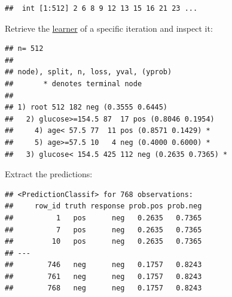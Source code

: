 \documentclass[]{scrbook}
\newenvironment{Shaded}{\begin{snugshade}}{\end{snugshade}}
\newcommand{\CommentTok}[1]{\textcolor[rgb]{0.56,0.35,0.01}{\textit{#1}}}
\newcommand{\DecValTok}[1]{\textcolor[rgb]{0.00,0.00,0.81}{#1}}
\newcommand{\KeywordTok}[1]{\textcolor[rgb]{0.13,0.29,0.53}{\textbf{#1}}}
\newcommand{\NormalTok}[1]{#1}
\newcommand{\OperatorTok}[1]{\textcolor[rgb]{0.81,0.36,0.00}{\textbf{#1}}}
\newcommand{\StringTok}[1]{\textcolor[rgb]{0.31,0.60,0.02}{#1}}
\renewenvironment{Shaded} {\begin{snugshade}\small} {\end{snugshade}}
\begin{document}
\begin{verbatim}
##  int [1:512] 2 6 8 9 12 13 15 16 21 23 ...
\end{verbatim}

Retrieve the \protect\hyperlink{learners}{learner} of a specific iteration and inspect it:

\begin{Shaded}
\end{Shaded}

\begin{verbatim}
## n= 512 
## 
## node), split, n, loss, yval, (yprob)
##       * denotes terminal node
## 
## 1) root 512 182 neg (0.3555 0.6445)  
##   2) glucose>=154.5 87  17 pos (0.8046 0.1954)  
##     4) age< 57.5 77  11 pos (0.8571 0.1429) *
##     5) age>=57.5 10   4 neg (0.4000 0.6000) *
##   3) glucose< 154.5 425 112 neg (0.2635 0.7365) *
\end{verbatim}

Extract the predictions:

\begin{Shaded}
\end{Shaded}

\begin{verbatim}
## <PredictionClassif> for 768 observations:
##     row_id truth response prob.pos prob.neg
##          1   pos      neg   0.2635   0.7365
##          7   pos      neg   0.2635   0.7365
##         10   pos      neg   0.2635   0.7365
## ---                                        
##        746   neg      neg   0.1757   0.8243
##        761   neg      neg   0.1757   0.8243
##        768   neg      neg   0.1757   0.8243
\end{verbatim}

\begin{Shaded}
\end{Shaded}
\end{document}

